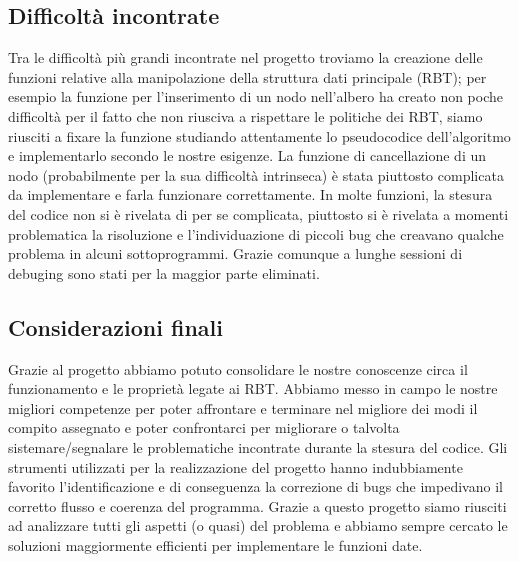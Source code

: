 \documentclass[paper=a4, fontsize=11pt,twoside]{scrartcl}   %
\begin{document}
			\subsection{Difficoltà incontrate}
				Tra le difficoltà più grandi incontrate nel progetto troviamo la creazione delle funzioni relative alla manipolazione della struttura dati principale (RBT); per esempio la funzione per l'inserimento di un nodo nell'albero ha creato non poche difficoltà per il fatto che non riusciva a rispettare le politiche dei RBT, siamo riusciti a fixare la funzione studiando attentamente lo pseudocodice dell'algoritmo e implementarlo secondo le nostre esigenze. La funzione di cancellazione di un nodo (probabilmente per la sua difficoltà intrinseca) è stata piuttosto complicata da implementare e farla funzionare correttamente. In molte funzioni, la stesura del codice non si è rivelata di per se complicata, piuttosto si è rivelata a momenti problematica la risoluzione e l’individuazione di piccoli bug che creavano qualche problema in alcuni sottoprogrammi. Grazie comunque a lunghe sessioni di debuging sono stati per la maggior parte eliminati.
				
			\subsection{Considerazioni finali}
				Grazie al progetto abbiamo potuto consolidare le nostre conoscenze circa il funzionamento e le proprietà legate ai RBT. Abbiamo messo in campo le nostre migliori competenze per poter affrontare e terminare nel migliore dei modi il compito assegnato e poter confrontarci per migliorare o talvolta sistemare/segnalare le problematiche incontrate durante la stesura del codice. Gli strumenti utilizzati per la realizzazione del progetto hanno indubbiamente favorito l'identificazione e di conseguenza la correzione di bugs che impedivano il corretto flusso e coerenza del programma. Grazie a questo progetto siamo riusciti ad analizzare tutti gli aspetti (o quasi) del problema e abbiamo sempre cercato le soluzioni maggiormente efficienti per implementare le funzioni date.					
		 
\end{document}

